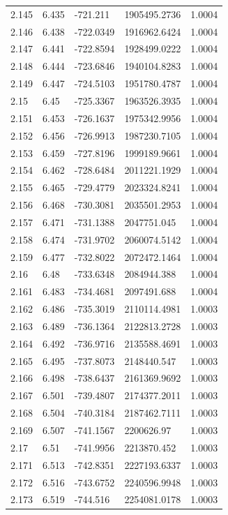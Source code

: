 \begin{tabular}{lllll}
2.145 & 6.435 & -721.211 & 1905495.2736 & 1.0004 \\
2.146 & 6.438 & -722.0349 & 1916962.6424 & 1.0004 \\
2.147 & 6.441 & -722.8594 & 1928499.0222 & 1.0004 \\
2.148 & 6.444 & -723.6846 & 1940104.8283 & 1.0004 \\
2.149 & 6.447 & -724.5103 & 1951780.4787 & 1.0004 \\
2.15 & 6.45 & -725.3367 & 1963526.3935 & 1.0004 \\
2.151 & 6.453 & -726.1637 & 1975342.9956 & 1.0004 \\
2.152 & 6.456 & -726.9913 & 1987230.7105 & 1.0004 \\
2.153 & 6.459 & -727.8196 & 1999189.9661 & 1.0004 \\
2.154 & 6.462 & -728.6484 & 2011221.1929 & 1.0004 \\
2.155 & 6.465 & -729.4779 & 2023324.8241 & 1.0004 \\
2.156 & 6.468 & -730.3081 & 2035501.2953 & 1.0004 \\
2.157 & 6.471 & -731.1388 & 2047751.045 & 1.0004 \\
2.158 & 6.474 & -731.9702 & 2060074.5142 & 1.0004 \\
2.159 & 6.477 & -732.8022 & 2072472.1464 & 1.0004 \\
2.16 & 6.48 & -733.6348 & 2084944.388 & 1.0004 \\
2.161 & 6.483 & -734.4681 & 2097491.688 & 1.0004 \\
2.162 & 6.486 & -735.3019 & 2110114.4981 & 1.0003 \\
2.163 & 6.489 & -736.1364 & 2122813.2728 & 1.0003 \\
2.164 & 6.492 & -736.9716 & 2135588.4691 & 1.0003 \\
2.165 & 6.495 & -737.8073 & 2148440.547 & 1.0003 \\
2.166 & 6.498 & -738.6437 & 2161369.9692 & 1.0003 \\
2.167 & 6.501 & -739.4807 & 2174377.2011 & 1.0003 \\
2.168 & 6.504 & -740.3184 & 2187462.7111 & 1.0003 \\
2.169 & 6.507 & -741.1567 & 2200626.97 & 1.0003 \\
2.17 & 6.51 & -741.9956 & 2213870.452 & 1.0003 \\
2.171 & 6.513 & -742.8351 & 2227193.6337 & 1.0003 \\
2.172 & 6.516 & -743.6752 & 2240596.9948 & 1.0003 \\
2.173 & 6.519 & -744.516 & 2254081.0178 & 1.0003 \\

\end{tabular}

